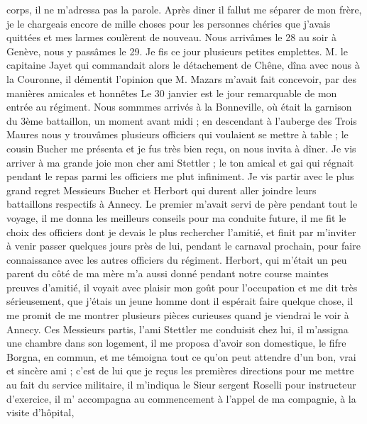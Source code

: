 \documentclass[12pt]{article}
\begin{document}
 corps, il ne m’adressa pas la parole. Après diner il
fallut me séparer de mon frère, je le chargeais encore de mille choses pour les personnes chéries
que j’avais quittées et mes larmes coulèrent de nouveau. Nous arrivâmes le 28 au soir à Genève, nous
y passâmes le 29. Je fis ce jour plusieurs petites emplettes. M. le capitaine Jayet qui commandait
alors le détachement de Chêne, dîna avec nous à la Couronne, il démentit l’opinion que M. Mazars
m’avait fait concevoir, par des manières amicales et honnêtes Le 30 janvier est le jour remarquable
de mon entrée au régiment. Nous sommmes arrivés à la Bonneville, où était la garnison du 3ème
battaillon, un moment avant midi ; en descendant à l’auberge des Trois Maures nous y trouvâmes
plusieurs officiers qui voulaient se mettre à table ; le cousin Bucher me présenta et je fus très
bien reçu, on nous invita à dîner. Je vis arriver à ma grande joie mon cher ami Stettler ; le ton
amical et gai qui régnait pendant le repas parmi les officiers me plut infiniment. Je vis partir
avec le plus grand regret Messieurs Bucher et Herbort qui durent aller joindre leurs battaillons
respectifs à Annecy. Le premier m’avait servi de père pendant tout le voyage, il me donna les
meilleurs conseils pour ma conduite future, il me fit le choix des officiers dont je devais le plus
rechercher l’amitié, et finit par m’inviter à venir passer quelques jours près de lui, pendant le
carnaval prochain, pour faire connaissance avec les autres officiers du régiment. Herbort, qui
m’était un peu parent du côté de ma mère m’a aussi donné pendant notre course maintes preuves
d’amitié, il voyait avec plaisir mon goût pour l’occupation et me dit très sérieusement, que j’étais
un jeune homme dont il espérait faire quelque chose, il me promit de me montrer plusieurs pièces
curieuses quand je viendrai le voir à Annecy. Ces Messieurs partis, l’ami Stettler me conduisit chez
lui, il m’assigna une chambre dans son logement, il me proposa d’avoir son domestique, le fifre
Borgna, en commun, et me témoigna tout ce qu’on peut attendre d’un bon, vrai et sincère ami ; c’est
de lui que je reçus les premières directions pour me mettre au fait du service militaire, il
m’indiqua le Sieur sergent Roselli pour instructeur d’exercice, il m’ accompagna au commencement à
l’appel de ma compagnie, à la visite d’hôpital,
\end{document}
